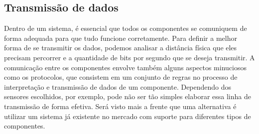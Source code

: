 \subsection{Transmissão de dados}
Dentro de um sistema, é essencial que todos os componentes se comuniquem de forma adequada para que tudo funcione corretamente. Para definir a melhor forma de se transmitir os dados, podemos analisar a distância física que eles precisam percorrer e a quantidade de bits por segundo que se deseja transmitir. A comunicação entre os componentes envolve também alguns aspectos minuciosos como os protocolos, que consistem em um conjunto de regras no processo de interpretação e transmissão de dados de um componente.  Dependendo dos sensores escolhidos, por exemplo, pode não ser tão simples elaborar essa linha de transmissão de forma efetiva. Será visto mais a frente que uma alternativa é utilizar um sistema já existente no mercado com suporte para diferentes tipos de componentes.

